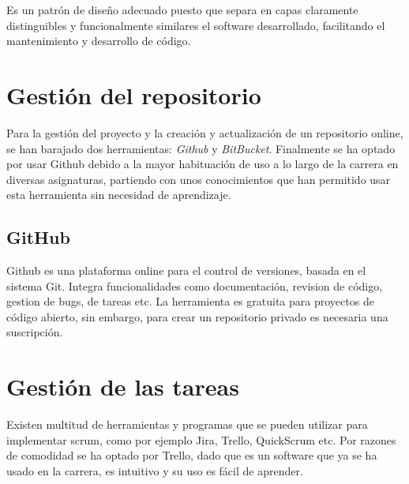 Es un patrón de diseño adecuado puesto que separa en capas claramente distinguibles y funcionalmente similares el software desarrollado, facilitando el mantenimiento y desarrollo de código.

\section{Gestión del repositorio}
Para la gestión del proyecto y la creación y actualización de un repositorio online, se han barajado dos herramientas: \emph{Github} y \emph{BitBucket}.
Finalmente se ha optado por usar Github debido a la mayor habituación de uso a lo largo de la carrera en diversas asignaturas, partiendo con unos conocimientos que han permitido usar esta herramienta sin necesidad de aprendizaje.
\subsection{GitHub}
Github es una plataforma online para el control de versiones, basada en el sistema Git. Integra funcionalidades como documentación, revision de código, gestion de bugs, de tareas etc.
La herramienta es gratuita para proyectos de código abierto, sin embargo, para crear un repositorio privado es necesaria una suscripción.

\section{Gestión de las tareas}
Existen multitud de herramientas y programas que se pueden utilizar para implementar scrum, como por ejemplo Jira, Trello, QuickScrum etc.
Por razones de comodidad se ha optado por Trello, dado que es un software que ya se ha usado en la carrera, es intuitivo y su uso es fácil de aprender.

